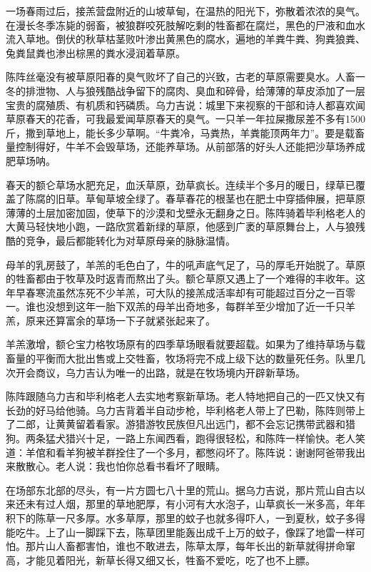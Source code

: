 \par 一场春雨过后，接羔营盘附近的山坡草甸，在温热的阳光下，弥散着浓浓的臭气。在漫长冬季冻毙的弱畜，被狼群咬死肢解吃剩的牲畜都在腐烂，黑色的尸液和血水流入草地。倒伏的秋草枯茎败叶渗出黄黑色的腐水，遍地的羊粪牛粪、狗粪狼粪、兔粪鼠粪也渗出棕黑的粪水浸润着草原。
\par 陈阵丝毫没有被草原阳春的臭气败坏了自己的兴致，古老的草原需要臭水。人畜一冬的排泄物、人与狼残酷战争留下的腐肉、臭血和碎骨，给薄薄的草皮添加了一层宝贵的腐殖质、有机质和钙磷质。乌力吉说：城里下来视察的干部和诗人都喜欢闻草原春天的花香，可我最爱闻草原春天的臭气。一只羊一年拉屎撒尿差不多有1500斤，撒到草地上，能长多少草啊。“牛粪冷，马粪热，羊粪能顶两年力”。要是载畜量控制得好，牛羊不会毁草场，还能养草场。从前部落的好头人还能把沙草场养成肥草场呐。
\par 春天的额仑草场水肥充足，血沃草原，劲草疯长。连续半个多月的暖日，绿草已覆盖了陈腐的旧草。草甸草坡全绿了。春草春花的根茎也在肥土中穿插伸展，把草原薄薄的土层加密加固，使草下的沙漠和戈壁永无翻身之日。陈阵骑着毕利格老人的大黄马轻快地小跑，一路欣赏着新绿的草原，他感到广袤的草原舞台上，人与狼残酷的竞争，最后都能转化为对草原母亲的脉脉温情。
\par 母羊的乳房鼓了，羊羔的毛色白了，牛的吼声底气足了，马的厚毛开始脱了。草原的牲畜都由于牧草及时返青而熬出了头。额仑草原又遇上了一个难得的丰收年。这年早春寒流虽然冻死不少羊羔，可大队的接羔成活率却有可能超过百分之一百零一。谁也没想到这年一胎下双羔的母羊出奇地多，每群羊至少增加了近一千只羊羔，原来还算富余的草场一下子就紧张起来了。
\par 羊羔激增，额仑宝力格牧场原有的四季草场眼看就要超载。如果为了维持草场与载畜量的平衡而大批出售或上交牲畜，牧场将完不成上级下达的数量死任务。队里几次开会商议，乌力吉认为唯一的出路，就是在牧场境内开辟新草场。
\par 陈阵跟随乌力吉和毕利格老人去实地考察新草场。老人特地把自己的一匹又快又有长劲的好马给他骑。乌力吉背着半自动步枪，毕利格老人带上了巴勒，陈阵则带上了二郎，让黄黄留着看家。游猎游牧民族但凡出远门，都不会忘记携带武器和猎狗。两条猛犬猎兴十足，一路上东闻西看，跑得很轻松，和陈阵一样愉快。老人笑道：羊倌和看羊狗被羊群拴住了一个多月，都憋闷坏了。陈阵说：谢谢阿爸带我出来散散心。老人说：我也怕你总看书看坏了眼睛。
\par 在场部东北部的尽头，有一片方圆七八十里的荒山。据乌力吉说，那片荒山自古以来还未有过人烟，那里的草地肥厚，有小河有大水泡子，山草疯长一米多高，年年积下的陈草一尺多厚。水多草厚，那里的蚊子也就多得吓人，一到夏秋，蚊子多得能吃牛。上了山一脚踩下去，陈草团里能轰出成千上万的蚊子，像踩了地雷一样可怕。那片山人畜都害怕，谁也不敢进去，陈草太厚，每年长出的新草就得拼命窜高，才能见着阳光，新草长得又细又长，牲畜不爱吃，吃了也不上膘。
